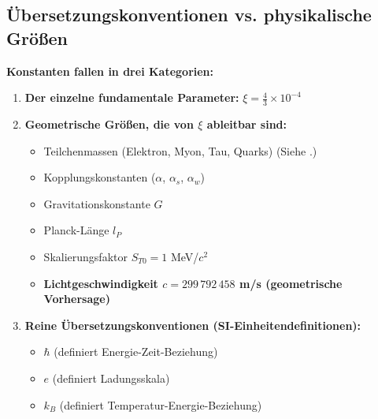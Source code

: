 	\subsection{Übersetzungskonventionen vs. physikalische Größen}
	
	\begin{keyresult}
		\textbf{Konstanten fallen in drei Kategorien:}
		\begin{enumerate}
			\item \textbf{Der einzelne fundamentale Parameter:} $\xi = \frac{4}{3} \times 10^{-4}$
			
			\item \textbf{Geometrische Größen, die von $\xi$ ableitbar sind:}
			\begin{itemize}
				\item Teilchenmassen (Elektron, Myon, Tau, Quarks) (Siehe \cite{Teilchenmassen_De}.)
				\item Kopplungskonstanten ($\alpha$, $\alpha_s$, $\alpha_w$)
				\item Gravitationskonstante $G$
				\item Planck-Länge $l_P$
				\item Skalierungsfaktor $S_{T0} = 1$ MeV/$c^2$
				\item \textbf{Lichtgeschwindigkeit $c = 299\,792\,458$ m/s (geometrische Vorhersage)}
			\end{itemize}
			
			\item \textbf{Reine Übersetzungskonventionen (SI-Einheitendefinitionen):}
			\begin{itemize}
				\item $\hbar$ (definiert Energie-Zeit-Beziehung)
				\item $e$ (definiert Ladungsskala)
				\item $k_B$ (definiert Temperatur-Energie-Beziehung)
			\end{itemize}
		\end{enumerate}
	\end{keyresult}
	
